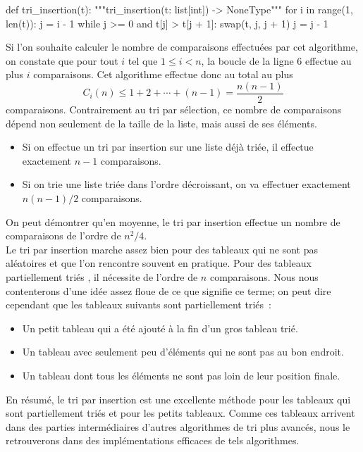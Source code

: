 \documentclass{magnoliaold}
\begin{document}
\begin{pythoncode}
def tri_insertion(t):
    """tri_insertion(t: list[int]) -> NoneType"""
    for i in range(1, len(t)):
        j = i - 1
        while j >= 0 and t[j] > t[j + 1]:
            swap(t, j, j + 1)
            j = j - 1
\end{pythoncode}
\noindent
Si l'on souhaite calculer le nombre de comparaisons effectuées par cet algorithme, on constate que
pour tout $i$ tel que $1\leq i<n$, la boucle de la ligne 6 effectue au plus $i$ comparaisons. Cet
algorithme effectue donc au total au plus
\[C_i(n) \leq 1+2+\cdots+(n-1)=\frac{n(n-1)}{2}\]
comparaisons. Contrairement au tri par sélection, ce nombre de comparaisons dépend non seulement de la taille de la liste, mais aussi de ses éléments.
\begin{itemize}
\item Si on effectue un tri par insertion sur une liste déjà triée, il effectue exactement $n-1$
  comparaisons.
\item Si on trie une liste triée dans l'ordre décroissant, on va effectuer
  exactement $n(n-1)/2$ comparaisons.
\end{itemize}
On peut démontrer qu'en moyenne, le tri par insertion effectue un nombre de comparaisons de l'ordre de $n^2/4$.\\

Le tri par insertion marche assez bien pour des tableaux qui ne sont pas aléatoires
et que l'on rencontre souvent en pratique. Pour des tableaux \og partiellement triés \fg, il
nécessite de l'ordre de $n$ comparaisons. Nous nous contenterons d'une idée assez floue de ce que
signifie ce terme; on peut dire cependant que les tableaux suivants sont partiellement triés~:
\begin{itemize}
\item Un petit tableau qui a été ajouté à la fin d'un gros tableau trié.
\item Un tableau avec seulement peu d'éléments qui ne sont pas au bon endroit.
\item Un tableau dont tous les éléments ne sont pas loin de leur position finale.
\end{itemize}
En résumé, le tri par insertion est une excellente méthode pour les tableaux qui
sont partiellement triés et pour les petits tableaux. Comme ces tableaux
arrivent dans des parties intermédiaires d'autres algorithmes de tri plus avancés,
nous le retrouverons dans des implémentations efficaces de tels algorithmes.
\end{document}

